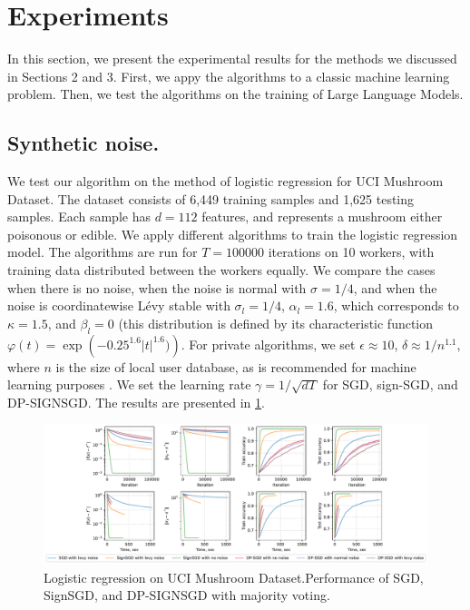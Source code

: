 \documentclass[12pt]{article}
\begin{document}
\section{Experiments}
In this section, we present the experimental results for the methods we discussed in Sections 2 and 3. First, we appy the algorithms to a classic machine learning problem. Then, we test the algorithms on the training of Large Language Models.

\subsection{Synthetic noise.}
We test our algorithm on the method of logistic regression for UCI Mushroom Dataset. The dataset consists of 6,449 training samples and 1,625 testing samples. Each sample has $d = 112$ features, and represents a mushroom either poisonous or edible. We apply different algorithms to train the logistic regression model. The algorithms are run for $T = 100000$ iterations on 10 workers, with training data distributed between the workers equally. We compare the cases when there is no noise, when the noise is normal with $\sigma = 1/4$, and when the noise is coordinatewise Lévy stable with $\sigma_l = 1/4$, $\alpha_l=1.6$, which corresponds to $\kappa=1.5$, and $\beta_l=0$ (this distribution is defined by its characteristic function $\varphi(t)=\exp\left(-0.25^{1.6}|t|^{1.6})\right)$. For private algorithms, we set $\epsilon \approx 10$, $\delta \approx 1/n^{1.1}$, where $n$ is the size of local user database, as is recommended for machine learning purposes \cite{Ponomareva2023}. We set the learning rate $\gamma = 1/\sqrt{d T}$ for SGD, sign-SGD, and {\scriptsize DP-SIGN}SGD. The results are presented in \ref{fig:logreg}.
\begin{figure}[h]
    \centering
    \includegraphics[width=1\textwidth]{../figs/v17_10_workers_long.pdf}
    \caption{Logistic regression on UCI Mushroom Dataset.\newline Performance of SGD, SignSGD, and {\scriptsize DP-SIGN}SGD with majority voting.}
    \label{fig:logreg}
\end{figure}
\end{document}
